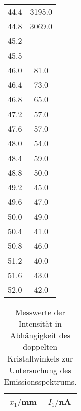 \begin{table}[htp]
\begin{center}
\begin{tabular}{cc}
                        44.4 & 3195.0\\
                        44.8 & 3069.0\\
                        45.2 & {-}\\
                        45.5 & {-}\\
                        46.0 & 81.0\\
                        46.4 & 73.0\\
                        46.8 & 65.0\\
                        47.2 & 57.0\\
                        47.6 & 57.0\\
                        48.0 & 54.0\\
                        48.4 & 59.0\\
                        48.8 & 50.0\\
                        49.2 & 45.0\\
                        49.6 & 47.0\\
                        50.0 & 49.0\\
                        50.4 & 41.0\\
                        50.8 & 46.0\\
                        51.2 & 40.0\\
                        51.6 & 43.0\\
                        52.0 & 42.0\\
                \bottomrule
                \end{tabular}
        \end{center}
\end{table}

\begin{longtable}{S[table-format=3.1] S[table-format=3.0]}
                \caption{Messwerte der Intensität in Abhängigkeit des doppelten Kristallwinkels zur Untersuchung des Emissionsspektrums.}\\
                \label{tab:emission}
                {$x_1/$mm} & {$I_1/$nA} \\
                \midrule

                \bottomrule
\end{longtable}
